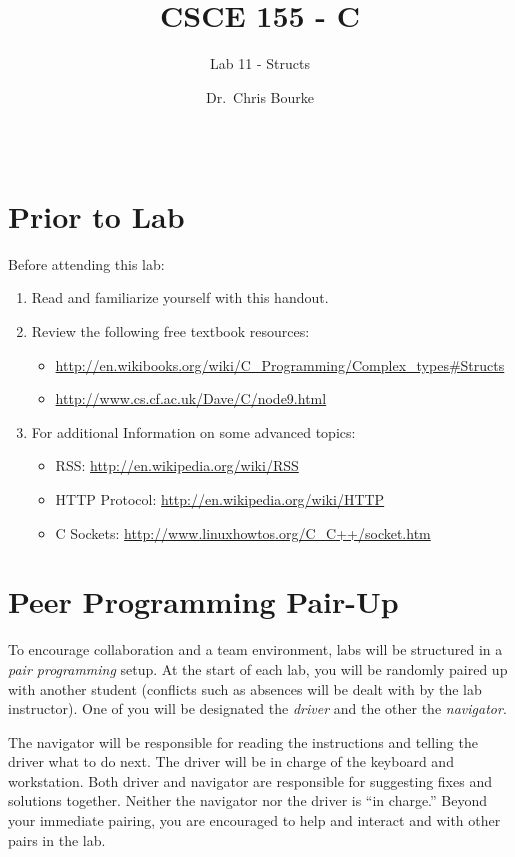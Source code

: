 \documentclass[12pt]{scrartcl}
\title{CSCE 155 - C}
\subtitle{Lab 11 - Structs}
\author{Dr.\ Chris Bourke}
\date{~}
\begin{document}
\maketitle

\section*{Prior to Lab}

Before attending this lab:
\begin{enumerate}
  \item Read and familiarize yourself with this handout.
  \item Review the following free textbook resources:
	\begin{itemize}
  	  \item \url{http://en.wikibooks.org/wiki/C_Programming/Complex_types#Structs}
	  \item \url{http://www.cs.cf.ac.uk/Dave/C/node9.html}
	\end{itemize}
  \item For additional Information on some advanced topics:
  \begin{itemize}
    \item RSS: \url{http://en.wikipedia.org/wiki/RSS}
    \item HTTP Protocol: \url{http://en.wikipedia.org/wiki/HTTP}
    \item C Sockets: \url{http://www.linuxhowtos.org/C_C++/socket.htm}
  \end{itemize}
\end{enumerate}

\section*{Peer Programming Pair-Up}

To encourage collaboration and a team environment, labs will be
structured in a \emph{pair programming} setup.  At the start of
each lab, you will be randomly paired up with another student 
(conflicts such as absences will be dealt with by the lab instructor).
One of you will be designated the \emph{driver} and the other
the \emph{navigator}.  

The navigator will be responsible for reading the instructions and
telling the driver what to do next.  The driver will be in charge of the
keyboard and workstation.  Both driver and navigator are responsible
for suggesting fixes and solutions together.  Neither the navigator
nor the driver is ``in charge.''  Beyond your immediate pairing, you
are encouraged to help and interact and with other pairs in the lab.
\end{document}
